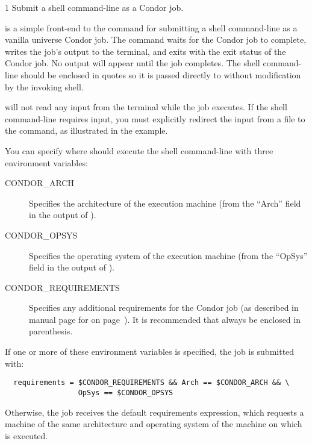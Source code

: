 \begin{ManPage}{\label{man-condor-run}}{1}
{Submit a shell command-line as a Condor job.}
\Synopsis {}


\Description
{} is a simple front-end to the  command for
submitting a shell command-line as a vanilla universe Condor job.  The
 command waits for the Condor job to complete, writes the
job's output to the terminal, and exits with the exit status of the
Condor job.  No output will appear until the job completes.  The shell
command-line should be enclosed in quotes so it is passed directly to
 without modification by the invoking shell.

 will not read any input from the terminal while the job
executes.  If the shell command-line requires input, you must
explicitly redirect the input from a file to the command, as
illustrated in the example.

You can specify where  should execute the shell
command-line with three environment variables:

\begin{description}
\item[CONDOR\_ARCH] Specifies the architecture of the execution
machine (from the ``Arch'' field in the output of ).
\item[CONDOR\_OPSYS] Specifies the operating system of the execution
machine (from the ``OpSys'' field in the output of ).
\item[CONDOR\_REQUIREMENTS] Specifies any additional requirements for
the Condor job (as described in manual page for  on
page~\pageref{man-condor-submit}).  It is recommended that
 always be enclosed in parenthesis.
\end{description}

If one or more of these environment variables is specified, the job is
submitted with:

\begin{verbatim}
  requirements = $CONDOR_REQUIREMENTS && Arch == $CONDOR_ARCH && \
                 OpSys == $CONDOR_OPSYS
\end{verbatim}

Otherwise, the job receives the default requirements expression, which
requests a machine of the same architecture and operating system of
the machine on which \Condor{run} is executed.


\end{ManPage}
